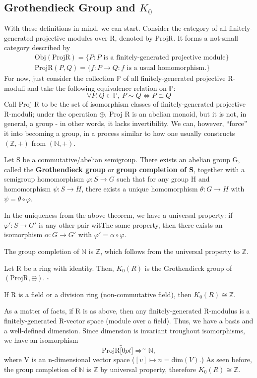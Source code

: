 \documentclass[../category_theory.tex]{subfiles}
\begin{document}
\subsection{Grothendieck Group and  \(K_{0}\)}
With these definitions in mind, we can start. Consider the category of all finitely-generated projective modules over R, denoted by \(\mathrm{Proj R}\). It forms a not-small category described by
\begin{align*}
	 & \mathrm{Obj}(\mathrm{Proj R})=\{P: P \text{ is a finitely-generated projective module}\} \\
	 & \mathrm{Proj R}(P, Q)=\{f:P\rightarrow Q: f \text{ is a usual homomorphism}.\}
\end{align*}
For now, just consider the collection \(\mathbb{P}\) of all finitely-generated projective R-moduli and take the following equivalence relation on \(\mathbb{P}:\)
\[
	\forall P, Q\in \mathbb{P},\: P\sim Q \Longleftrightarrow P\cong Q
\]
Call Proj R to be the set of isomorphism classes of finitely-generated projective R-moduli; under the operation \(\oplus\), Proj R is an abelian monoid, but it is not, in general, a group - in other words, it lacks invertibility. We can, however, ``force'' it into becoming a group, in a process similar to how one usually constructs \((\mathbb{Z}, +)\) from \((\mathbb{N}, +)\).
\begin{theorem*}
	Let S be a commutative/abelian semigroup. There exists an abelian group G, called the \textbf{Grothendieck group} or \textbf{group completion of S}, together with a semigroup homomorphism \(\varphi :S\rightarrow G\) such that for any group H and homomorphism \(\psi:S\rightarrow H\), there exists a unique homomorphism \(\theta:G\rightarrow H\) with \(\psi = \theta \circ \varphi \).
\end{theorem*}
In the uniqueness from the above theorem, we have a universal property: if \(\varphi':S\rightarrow G'\) is any other pair witThe same property, then there exists an isomorphism \(\alpha:G\rightarrow G'\) with \(\varphi'=\alpha \circ \varphi \).
\begin{example}
	The group completion of \(\mathbb{N}\) is \(\mathbb{Z}\), which follows from the universal property to \(\mathbb{Z}.\)
\end{example}
\begin{def*}
	Let R be a ring with identity. Then, \(K_{0}(R)\) is the Grothendieck group of \((\mathrm{Proj R}, \oplus)\). \(\square\)
\end{def*}
\begin{example}
	If R is a field or a division ring (non-commutative field), then \(K_{0}(R)\cong \mathbb{Z}.\)

	As a matter of facts, if R is as above, then any finitely-generated R-modulus is a finitely-generated R-vector space (module over a field). Thus, we have a basis and a well-defined dimension. Since dimension is invariant troughout isomorphisms, we have an isomorphism
	\[
		\mathrm{Proj R}\overbracket[0pt]{\Rightarrow}^{\sim}\mathbb{N},
	\]
	where V is an n-dimensional vector space (\([v]\mapsto n=\mathrm{dim}(V)\).) As seen before, the group completion of \(\mathbb{N}\) is \(\mathbb{Z}\) by universal property, therefore \(K_{0}(R)\cong \mathbb{Z}.\)
\end{example}
\end{document}

